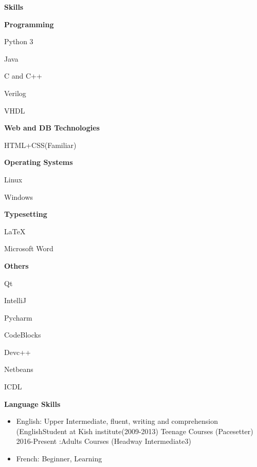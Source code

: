 \documentclass[a4paper,12pt,final]{memoir}
\newcommand{\SmallSep}{\vspace{0.5em}}
\newcommand{\CVSection}[1]
	{\Large\textbf{#1}\par
	\SmallSep\normalsize\normalfont}
\newcommand{\CVItem}[1]
	{\textbf{\color{RoyalBlue} #1}}
\begin{document}
\CVSection{Skills}
\CVItem{Programming}
\begin{multicols}{3}
\begin{compactitem}[\color{RoyalBlue}$\circ$]
	\item Python 3
	\item Java
	\item C and C++
	\item Verilog
	\item VHDL
	
\end{compactitem}
\end{multicols}
\SmallSep
\CVItem{Web and DB Technologies}
\begin{multicols}{3}
\begin{compactitem}[\color{RoyalBlue}$\circ$]
	\item HTML+CSS(Familiar)
\end{compactitem}
\end{multicols}
\SmallSep
\CVItem{Operating Systems}
\begin{multicols}{3}
\begin{compactitem}[\color{RoyalBlue}$\circ$]
	\item Linux
	\item Windows
\end{compactitem}
\end{multicols}
\SmallSep
\CVItem{Typesetting}
\begin{multicols}{3}
\begin{compactitem}[\color{RoyalBlue}$\circ$]
	\item LaTeX
	\item Microsoft Word
\end{compactitem}
\end{multicols}
\SmallSep
\CVItem{Others}
\begin{multicols}{3}
\begin{compactitem}[\color{RoyalBlue}$\circ$]
	\item Qt
	\item IntelliJ
	\item Pycharm
    	\item  CodeBlocks
    		\item Devc++
    			\item Netbeans
    			\item ICDL
    		
    			
\end{compactitem}
\end{multicols}


\SmallSep
\CVItem{Language Skills}
	\begin{itemize}[$\circ$]

\item English: 
Upper Intermediate, fluent, writing and comprehension
(EnglishStudent at Kish institute(2009-2013) Teenage Courses (Pacesetter) 
2016-Present :Adults Courses (Headway Intermediate3)
\item French: Beginner, Learning
	\end{itemize}
\end{document}
